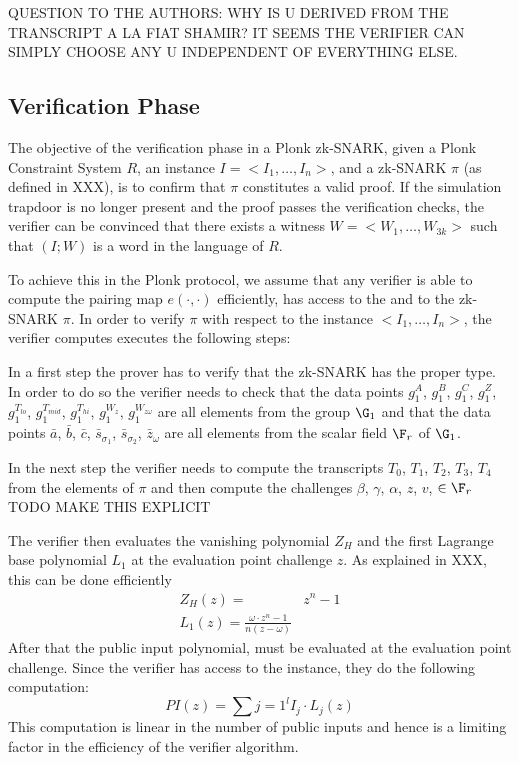 QUESTION TO THE AUTHORS: WHY IS U DERIVED FROM THE TRANSCRIPT A LA FIAT SHAMIR? IT SEEMS THE VERIFIER CAN SIMPLY CHOOSE ANY U INDEPENDENT OF EVERYTHING ELSE.

\subsection{Verification Phase}
The objective of the verification phase in a Plonk zk-SNARK, given a Plonk Constraint System $R$, an instance $I = <I_1, \ldots, I_n>$, and a zk-SNARK $\pi$ (as defined in XXX), is to confirm that $\pi$ constitutes a valid proof. If the simulation trapdoor is no longer present and the proof passes the verification checks, the verifier can be convinced that there exists a witness $W = <W_1, \ldots, W_{3k}>$ such that $(I;W)$ is a word in the language of $R$. 

To achieve this in the Plonk protocol, we assume that any verifier is able to compute the pairing map $e(\cdot,\cdot)$ efficiently, has access to the  and to the zk-SNARK $\pi$. In order to verify $\pi$ with respect to the instance $<I_1,\ldots, I_n>$, the verifier computes executes the following steps:

In a first step the prover has to verify that the zk-SNARK has the proper type. In order to do so the verifier needs to check that the data points $g_1^A$, $g_1^B$, $g_1^C$, $g_1^Z$, $g_1^{T_{lo}}$, $g_1^{T_{mid}}$, $g_1^{T_{hi}}$, $g_1^{W_z}$, $g_1^{W_{z\omega}}$ are all elements from the group $\G_1$ and that the data points $\bar{a}$, $\bar{b}$, $\bar{c}$, $\bar{s}_{\sigma_1}$, $\bar{s}_{\sigma_2}$, $\bar{z}_{\omega}$ are all elements from the scalar field $\F_r$ of $\G_1$.

In the next step the verifier needs to compute the transcripts $T_0$, $T_1$, $T_2$, $T_3$, $T_4$ from the elements of $\pi$ and then compute the challenges $\beta$, $\gamma$, $\alpha$, $z$, $v$, $\in \F_r$
TODO MAKE THIS EXPLICIT

The verifier then evaluates the vanishing polynomial $Z_H$ and the first Lagrange base polynomial $L_1$ at the evaluation point challenge $z$. As explained in XXX, this can be done efficiently
\begin{equation}
\begin{array}{rl}
Z_H(z) = & z^n -1\\
L_1(z) = \frac{\omega\cdot z^n-1}{n(z-\omega)} 
\end{array}
\end{equation}
After that the public input polynomial, must be evaluated at the evaluation point challenge. Since the verifier has access to the instance, they do the following computation:
\begin{equation}
PI(z) = \sum{j=1}^l I_j\cdot L_j(z)
\end{equation}
This computation is linear in the number of public inputs and hence is a limiting factor in the efficiency of the verifier algorithm. 

